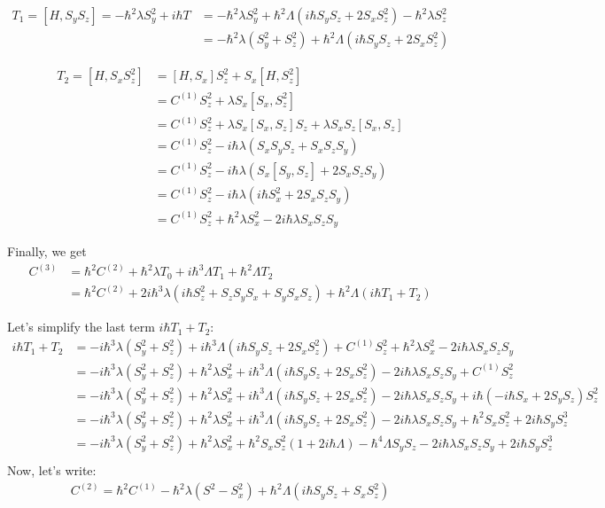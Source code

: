 \documentclass[11pt,a4paper]{article}
\begin{document}
\begin{align*}
T_1 =[H, S_y S_z]  = - \hbar^2 \lambda S_y^2  + i \hbar T &= - \hbar^2 \lambda S_y^2  +  \hbar^2 \Lambda  ( i \hbar S_y S_z+ 2 S_x S_z^2) - \hbar^2 \lambda   S_z^2\\
&= - \hbar^2 \lambda (S_y^2 + S_z^2) +  \hbar^2 \Lambda  ( i \hbar S_y S_z+ 2 S_x S_z^2) 
\end{align*}

\begin{align*}
T_2 =[H, S_x S_z^2] & = [H, S_x ]S_z^2 + S_x [H,  S_z^2] \\
 &= C^{(1)}S_z^2 + \lambda S_x [S_x,  S_z^2]  \\
&= C^{(1)}S_z^2 + \lambda S_x [S_x,  S_z]S_z + \lambda S_x S_z [S_x,  S_z]  \\
&= C^{(1)}S_z^2 - i \hbar  \lambda (S_x S_y S_z +  S_x S_z S_y)  \\
&= C^{(1)}S_z^2 - i \hbar  \lambda (S_x [S_y, S_z] + 2 S_x S_z S_y)  \\
&= C^{(1)}S_z^2 - i \hbar  \lambda (i \hbar S_x^2 + 2 S_x S_z S_y)  \\
&= C^{(1)}S_z^2 + \hbar^2  \lambda  S_x^2  - 2 i \hbar  \lambda  S_x S_z S_y
\end{align*}

Finally, we get 
\begin{align*}
C^{(3)}&=\hbar^2  C^{(2)} +  \hbar^2 \lambda  T_0   +  i  \hbar^3 \Lambda T_1 + \hbar^2 \Lambda T_2 \\
&=\hbar^2  C^{(2)} +  2i \hbar^3 \lambda  (i \hbar S_z^2  + S_z S_y S_x   + S_y S_xS_z )    +  \hbar^2 \Lambda( i  \hbar T_1 +  T_2) 
\end{align*}

 Let's simplify the last term $i  \hbar T_1 +  T_2$:
 \begin{align*}
 i  \hbar T_1 +  T_2 &= - i \hbar^3 \lambda (S_y^2 + S_z^2) +  i \hbar^3 \Lambda  ( i \hbar S_y S_z+ 2 S_x S_z^2) +  C^{(1)}S_z^2 + \hbar^2  \lambda  S_x^2  - 2 i \hbar  \lambda  S_x S_z S_y \\
 &= - i \hbar^3 \lambda (S_y^2 + S_z^2)   + \hbar^2  \lambda  S_x^2 + i \hbar^3 \Lambda  ( i \hbar S_y S_z+ 2 S_x S_z^2) - 2 i \hbar  \lambda  S_x S_z S_y +  C^{(1)}S_z^2 \\
 &= - i \hbar^3 \lambda (S_y^2 + S_z^2)   + \hbar^2  \lambda  S_x^2 + i \hbar^3 \Lambda  ( i \hbar S_y S_z+ 2 S_x S_z^2) - 2 i \hbar  \lambda  S_x S_z S_y +  i \hbar (- i \hbar S_x +  2 S_y S_z) S_z^2 \\
  &= - i \hbar^3 \lambda (S_y^2 + S_z^2)   + \hbar^2  \lambda  S_x^2 + i \hbar^3 \Lambda  ( i \hbar S_y S_z+ 2 S_x S_z^2) - 2 i \hbar  \lambda  S_x S_z S_y +  \hbar^2 S_x S_z^2 +  2  i \hbar S_y  S_z^3 \\
   &= - i \hbar^3 \lambda (S_y^2 + S_z^2)   + \hbar^2  \lambda  S_x^2 +  \hbar^2 S_x S_z^2 (1+ 2 i \hbar \Lambda)  - \hbar^4 \Lambda  S_y S_z - 2 i \hbar  \lambda  S_x S_z S_y   +  2  i \hbar S_y  S_z^3 \\
 \end{align*}
 Now, let's write:
 \begin{align*}
   C^{(2)}= \hbar^2 C^{(1)}  -  \hbar^2 \lambda (S^2 - S_x^2)  + \hbar^2 \Lambda  ( i \hbar S_y S_z+  S_x S_z^2)
 \end{align*}
\end{document}
